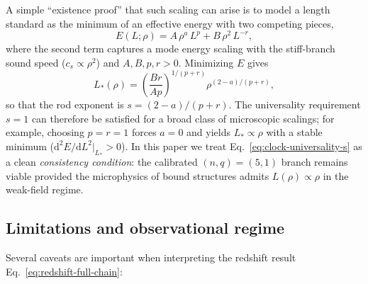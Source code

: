 \documentclass[11pt]{article}
\begin{document}
A simple ``existence proof'' that such scaling can arise is to model a length
standard as the minimum of an effective energy with two competing pieces,
\begin{equation}
  E(L;\rho) = A\,\rho^{a}\,L^{p} + B\,\rho^{2}\,L^{-r},
  \label{eq:rod-energy-model}
\end{equation}
where the second term captures a mode energy scaling with the stiff-branch
sound speed ($c_s\propto\rho^2$) and $A,B,p,r>0$.
Minimizing $E$ gives
\begin{equation}
  L_{*}(\rho)
  = \left(\frac{B r}{A p}\right)^{\!1/(p+r)}
    \rho^{(2-a)/(p+r)},
  \label{eq:rod-length-minimum}
\end{equation}
so that the rod exponent is $s=(2-a)/(p+r)$.
The universality requirement $s=1$ can therefore be satisfied for a broad
class of microscopic scalings; for example, choosing $p=r=1$ forces $a=0$ and
yields $L_{*}\propto\rho$ with a stable minimum
($\mathrm{d}^2E/\mathrm{d}L^2|_{L_*}>0$).
In this paper we treat Eq.~\eqref{eq:clock-universality-s} as a clean
\emph{consistency condition}: the calibrated $(n,q)=(5,1)$ branch remains viable
provided the microphysics of bound structures admits $L(\rho)\propto\rho$ in the
weak-field regime.

\subsection{Limitations and observational regime}
\label{subsec:redshift-limitations}

Several caveats are important when interpreting the redshift result
Eq.~\eqref{eq:redshift-full-chain}:
\end{document}

